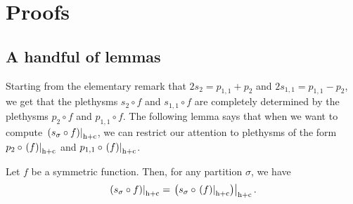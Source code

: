 \documentclass[twoside]{article}
\renewcommand{\hc}[1]{\left.\left(#1\right)\right|_{\textnormal{h+c}}}
\begin{document}
\section{Proofs} \label{proof}

\subsection{A handful of lemmas}\label{sec:handful}

Starting from the elementary remark that $2 s_2 = p_{1,1} + p_2$ and $2 s_{1,1} = p_{1,1} - p_2$, we get that the plethysms $s_2\circ f$ and $s_{1,1}\circ f$ are completely determined by the plethysms $p_{2}\circ f$ and $p_{1,1}\circ f$. The following lemma says that when we want to compute $\hc{s_\sigma\circ f} $, we can restrict our attention 
to  plethysms of the form $p_{2}\circ\hc{f}$ and $p_{1,1}\circ\hc{f}$. 

\begin{lem}\label{s2 o f} Let $f$ be a symmetric function. Then, for any partition $\sigma$, we have 
\[
\hc{s_\sigma\circ f} = \hc{s_\sigma \circ \hc{f}}.
\]
\end{lem}
 
\end{document}
